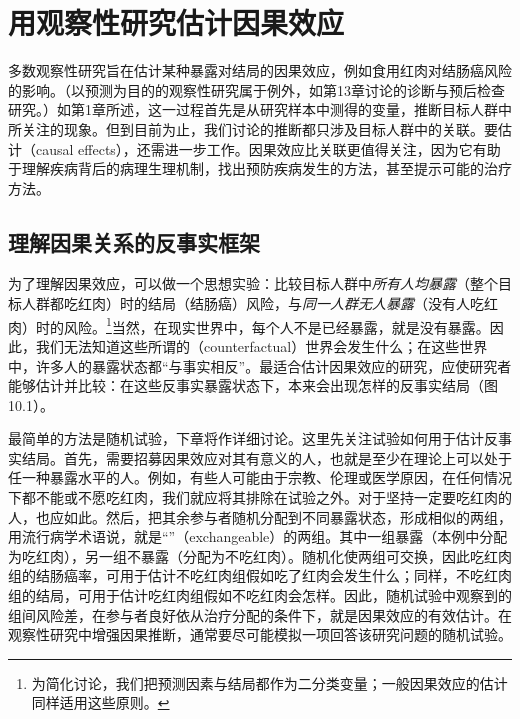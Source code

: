 \chapter{用观察性研究估计因果效应}
\begingroup\setlength{\tabcolsep}{3pt}
多数观察性研究旨在估计某种暴露对结局的因果效应，例如食用红肉对结肠癌风险的影响。（以预测为目的的观察性研究属于例外，如第13章讨论的诊断与预后检查研究。）如第1章所述，这一过程首先是从研究样本中测得的变量，推断目标人群中所关注的现象。但到目前为止，我们讨论的推断都只涉及目标人群中的关联。要估计（causal effects），还需进一步工作。因果效应比关联更值得关注，因为它有助于理解疾病背后的病理生理机制，找出预防疾病发生的方法，甚至提示可能的治疗方法。

\section{理解因果关系的反事实框架}
为了理解因果效应，可以做一个思想实验：比较目标人群中\emph{所有人均暴露}（整个目标人群都吃红肉）时的结局（结肠癌）风险，与\emph{同一人群无人暴露}（没有人吃红肉）时的风险。\footnote{为简化讨论，我们把预测因素与结局都作为二分类变量；一般因果效应的估计同样适用这些原则。}当然，在现实世界中，每个人不是已经暴露，就是没有暴露。因此，我们无法知道这些所谓的（counterfactual）世界会发生什么；在这些世界中，许多人的暴露状态都“与事实相反”。最适合估计因果效应的研究，应使研究者能够估计并比较：在这些反事实暴露状态下，本来会出现怎样的反事实结局（图10.1）。

\par
\begin{center}\begin{minipage}{\textwidth}\centering\chTenCounterfactual
{}
\end{minipage}\end{center}
\par

最简单的方法是随机试验，下章将作详细讨论。这里先关注试验如何用于估计反事实结局。首先，需要招募因果效应对其有意义的人，也就是至少在理论上可以处于任一种暴露水平的人。例如，有些人可能由于宗教、伦理或医学原因，在任何情况下都不能或不愿吃红肉，我们就应将其排除在试验之外。对于坚持一定要吃红肉的人，也应如此。然后，把其余参与者随机分配到不同暴露状态，形成相似的两组，用流行病学术语说，就是“”（exchangeable）的两组。其中一组暴露（本例中分配为吃红肉），另一组不暴露（分配为不吃红肉）。随机化使两组可交换，因此吃红肉组的结肠癌率，可用于估计不吃红肉组假如吃了红肉会发生什么；同样，不吃红肉组的结局，可用于估计吃红肉组假如不吃红肉会怎样。因此，随机试验中观察到的组间风险差，在参与者良好依从治疗分配的条件下，就是因果效应的有效估计。在观察性研究中增强因果推断，通常要尽可能模拟一项回答该研究问题的随机试验。

